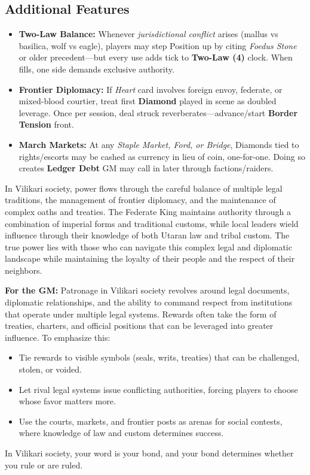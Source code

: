 \subsection*{Additional Features}
\begin{itemize}
\item \textbf{Two-Law Balance:} Whenever \emph{jurisdictional conflict} arises (mallus vs basilica, wolf vs eagle), players may step Position up by citing \emph{Foedus Stone} or older precedent—but every use adds tick to \textbf{Two-Law (4)} clock. When fills, one side demands exclusive authority.
\item \textbf{Frontier Diplomacy:} If \emph{Heart} card involves foreign envoy, federate, or mixed-blood courtier, treat first \textbf{Diamond} played in scene as doubled leverage. Once per session, deal struck reverberates—advance/start \textbf{Border Tension} front.
\item \textbf{March Markets:} At any \emph{Staple Market, Ford, or Bridge}, Diamonds tied to rights/escorts may be cashed as currency in lieu of coin, one-for-one. Doing so creates \textbf{Ledger Debt} GM may call in later through factions/raiders.
\end{itemize}

\begin{tcolorbox}[colback=black!3,colframe=black!40!white,title={Patronage \& Power}]
In Vilikari society, power flows through the careful balance of multiple legal traditions, the management of frontier diplomacy, and the maintenance of complex oaths and treaties. The Federate King maintains authority through a combination of imperial forms and traditional customs, while local leaders wield influence through their knowledge of both Utaran law and tribal custom. The true power lies with those who can navigate this complex legal and diplomatic landscape while maintaining the loyalty of their people and the respect of their neighbors.

\textbf{For the GM:}  
Patronage in Vilikari society revolves around legal documents, diplomatic relationships, and the ability to command respect from institutions that operate under multiple legal systems. Rewards often take the form of treaties, charters, and official positions that can be leveraged into greater influence. To emphasize this:
\begin{itemize}
\item Tie rewards to visible symbols (seals, writs, treaties) that can be challenged, stolen, or voided.
\item Let rival legal systems issue conflicting authorities, forcing players to choose whose favor matters more.
\item Use the courts, markets, and frontier posts as arenas for social contests, where knowledge of law and custom determines success.
\end{itemize}
In Vilikari society, your word is your bond, and your bond determines whether you rule or are ruled.
\end{tcolorbox}

